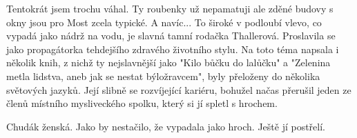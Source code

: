 
Tentokrát jsem trochu váhal. Ty roubenky už nepamatuji ale zděné
budovy s okny jsou pro Most zcela typické. A navíc... To široké v
podloubí vlevo, co vypadá jako nádrž na vodu, je slavná tamní rodačka
Thallerová. Proslavila se jako propagátorka tehdejšího zdravého
životního stylu. Na toto téma napsala i několik knih, z nichž ty
nejslavnější jako "Kilo bůčku do lalůčku" a "Zelenina metla lidstva,
aneb jak se nestat býložravcem", byly přeloženy do několika světových
jazyků. Její slibně se rozvíjející kariéru, bohužel načas přerušil
jeden ze členů místního mysliveckého spolku, který si jí spletl s
hrochem.

Chudák ženská. Jako by nestačilo, že vypadala jako hroch. Ještě jí
postřelí.
